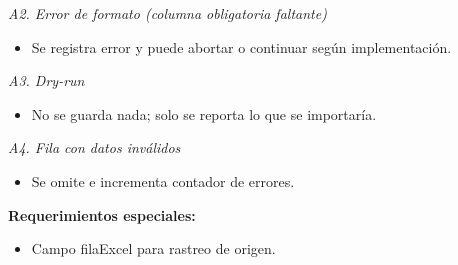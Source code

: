 \vspace{0.3em}
\noindent\textit{A2. Error de formato (columna obligatoria faltante)}
\begin{itemize}[nosep]
   \item Se registra error y puede abortar o continuar según implementación.
\end{itemize}

\vspace{0.3em}
\noindent\textit{A3. Dry-run}
\begin{itemize}[nosep]
   \item No se guarda nada; solo se reporta lo que se importaría.
\end{itemize}

\vspace{0.3em}
\noindent\textit{A4. Fila con datos inválidos}
\begin{itemize}[nosep]
   \item Se omite e incrementa contador de errores.
\end{itemize}

\vspace{0.5em}
\noindent\textbf{Requerimientos especiales:}
\begin{itemize}[nosep]
   \item Campo filaExcel para rastreo de origen.
\end{itemize}

